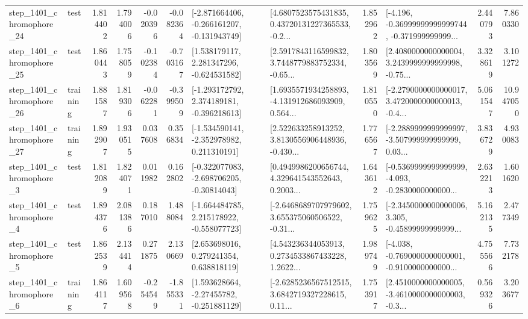 \begin{tabular}{llrrrrllrlrr}
 step\_1401\_chromophore\_24 &      test &      1.814402 &    1.794006 &     -0.020396 & -0.082364 &  [-2.871664406, -0.266161207, -0.131943749] &  [4.6807523575431835, 0.43720131227365533, -0.2... &       1.852962 &  [-4.196, -0.36999999999999744, -0.371999999999... &            2.440793 &          7.860330 \\
 step\_1401\_chromophore\_25 &      test &      1.860443 &    1.758059 &     -0.102384 & -0.703167 &    [1.538179117, 2.281347296, -0.624531582] &  [2.5917843116599832, 3.7448779883752334, -0.65... &       1.803569 &  [2.4080000000000004, 3.2439999999999998, -0.75... &            3.328619 &          3.101272 \\
 step\_1401\_chromophore\_26 &  training &      1.881587 &    1.819306 &     -0.062281 & -0.399509 &   [-1.293172792, 2.374189181, -0.396218613] &  [1.6935571934258893, -4.131912686093909, 0.564... &       1.810550 &  [-2.2790000000000017, 3.4720000000000013, -0.4... &            5.061547 &         10.947050 \\
 step\_1401\_chromophore\_27 &  training &      1.892907 &    1.930515 &      0.037608 &  0.356834 &   [-1.534590141, -2.352978982, 0.211310191] &  [2.522633258913252, 3.8130556906448936, -0.430... &       1.776567 &  [-2.2889999999999997, -3.507999999999999, 0.03... &            3.836729 &          4.930083 \\
  step\_1401\_chromophore\_3 &      test &      1.812089 &    1.824071 &      0.011982 &  0.162802 &   [-0.322077083, -2.698706205, -0.30814043] &  [0.4949986200656744, 4.329641543552643, 0.2003... &       1.643612 &  [-0.5369999999999999, -4.093, -0.2830000000000... &            2.632213 &          1.601620 \\
  step\_1401\_chromophore\_4 &      test &      1.894376 &    2.081386 &      0.187010 &  1.488084 &   [-1.664484785, 2.215178922, -0.558077723] &  [-2.6468689707979602, 3.655375060506522, -0.31... &       1.759625 &  [-2.3450000000000006, 3.305, -0.45899999999999... &            5.162135 &          2.477349 \\
  step\_1401\_chromophore\_5 &      test &      1.862539 &    2.134414 &      0.271875 &  2.130669 &     [2.653698016, 0.279241354, 0.638818119] &  [4.543236344053913, 0.2734533867433228, 1.2622... &       1.989749 &  [-4.038, -0.7690000000000001, -0.9100000000000... &            4.755566 &          7.732178 \\
  step\_1401\_chromophore\_6 &  training &      1.864117 &    1.609568 &     -0.254549 & -1.855331 &    [1.593628664, -2.27455782, -0.251881129] &  [-2.6285236567512515, 3.6842719327228615, 0.11... &       1.753917 &  [2.4510000000000005, -3.4610000000000003, -0.3... &            0.569326 &          3.203677 \\

\end{tabular}
